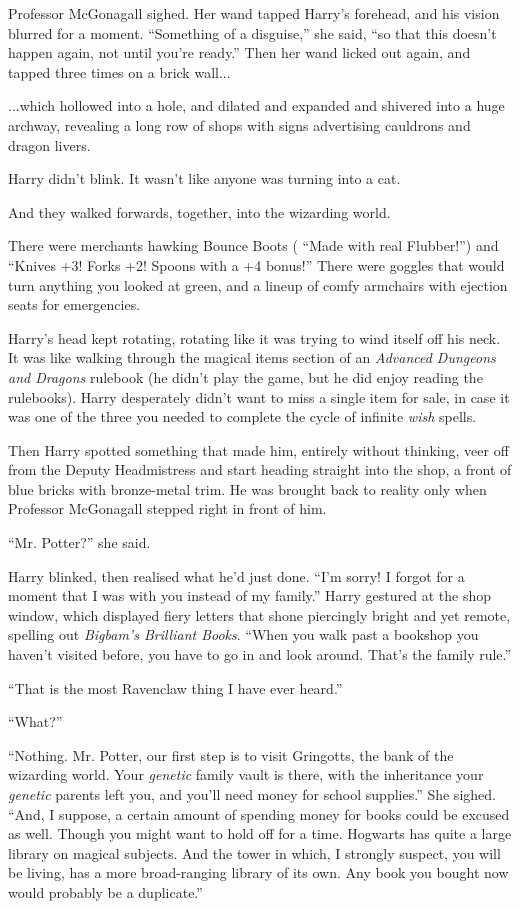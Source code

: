 Professor McGonagall sighed. Her wand tapped Harry's forehead, and his
vision blurred for a moment. ``Something of a disguise,'' she said, ``so
that this doesn't happen again, not until you're ready.'' Then her wand
licked out again, and tapped three times on a brick wall...

...which hollowed into a hole, and dilated and expanded and
shivered into a huge archway, revealing a long row of shops with signs
advertising cauldrons and dragon livers.

Harry didn't blink. It wasn't like anyone was turning into a cat.

And they walked forwards, together, into the wizarding world.

There were merchants hawking Bounce Boots ( ``Made with real Flubber!'')
and ``Knives +3! Forks +2! Spoons with a +4 bonus!'' There were goggles
that would turn anything you looked at green, and a lineup of comfy
armchairs with ejection seats for emergencies.

Harry's head kept rotating, rotating like it was trying to wind itself
off his neck. It was like walking through the magical items section of
an \emph{Advanced Dungeons and Dragons} rulebook (he didn't play the
game, but he did enjoy reading the rulebooks). Harry desperately didn't
want to miss a single item for sale, in case it was one of the three you
needed to complete the cycle of infinite \emph{wish} spells.

Then Harry spotted something that made him, entirely without thinking,
veer off from the Deputy Headmistress and start heading straight into
the shop, a front of blue bricks with bronze-metal trim. He was brought
back to reality only when Professor McGonagall stepped right in front of
him.

``Mr. Potter?'' she said.

Harry blinked, then realised what he'd just done. ``I'm sorry! I forgot
for a moment that I was with you instead of my family.'' Harry gestured
at the shop window, which displayed fiery letters that shone piercingly
bright and yet remote, spelling out \emph{Bigbam's Brilliant Books}.
``When you walk past a bookshop you haven't visited before, you have to
go in and look around. That's the family rule.''

``That is the most Ravenclaw thing I have ever heard.''

``What?''

``Nothing. Mr. Potter, our first step is to visit Gringotts, the bank of
the wizarding world. Your \emph{genetic} family vault is there, with the
inheritance your \emph{genetic} parents left you, and you'll need money
for school supplies.'' She sighed. ``And, I suppose, a certain amount of
spending money for books could be excused as well. Though you might want
to hold off for a time. Hogwarts has quite a large library on magical
subjects. And the tower in which, I strongly suspect, you will be
living, has a more broad-ranging library of its own. Any book you bought
now would probably be a duplicate.''

